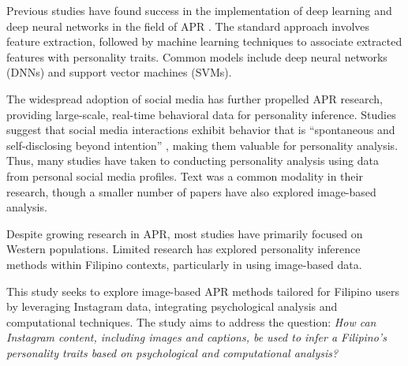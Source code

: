 Previous studies have found success in the implementation of deep learning and deep neural networks in the field of APR \citep{Zhao2022}. The standard approach involves feature extraction, followed by machine learning techniques to associate extracted features with personality traits. Common models include deep neural networks (DNNs) and support vector machines (SVMs). 

The widespread adoption of social media has further propelled APR research, providing large-scale, real-time behavioral data for personality inference. Studies suggest that social media interactions exhibit behavior that is “spontaneous and self-disclosing beyond intention” \citep{Vinciarelli2014}, making them valuable for personality analysis. Thus, many studies have taken to conducting personality analysis using data from personal social media profiles. Text was a common modality in their research, though a smaller number of papers have also explored image-based analysis. 

Despite growing research in APR, most studies have primarily focused on Western populations. Limited research has explored personality inference methods within Filipino contexts, particularly in using image-based data.



This study seeks to explore image-based APR methods tailored for Filipino users by leveraging Instagram data, integrating psychological analysis and computational techniques. The study aims to address the question: \textit{How can Instagram content, including images and captions, be used to infer a Filipino’s personality traits based on psychological and computational analysis?}

